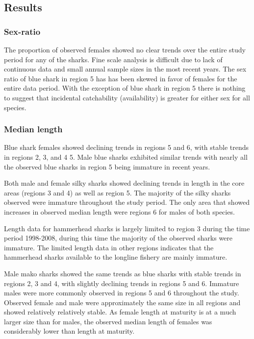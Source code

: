 \documentclass[12pt]{SCreport}
\begin{document}
% 
\subsection{Results}
\subsubsection{Sex-ratio}
    The proportion of observed females showed no clear trends over the entire study period for any of the sharks.  Fine scale analysis is difficult due to lack of continuous data and small annual sample sizes in the most recent years.   The sex ratio of blue shark in region 5 has has been skewed in favor of females for the entire data period. With the exception of blue shark in region 5 there is nothing to suggest that incidental catchability (availability) is greater for either sex for all species.
    
\subsubsection{Median length}
Blue shark females showed declining trends in regions 5 and 6, with stable trends in regions 2, 3, and 4 5. Male blue sharks exhibited similar trends with nearly all the observed blue sharks in region 5 being immature in recent years. 

Both male and female silky sharks showed declining trends in length in the core areas (regions 3 and 4) as well as region 5.  The majority of the silky sharks observed were immature throughout the study period. The only area  that showed increases in observed median length were regions 6 for males of both species. 

Length data for hammerhead sharks is largely limited to region 3 during the time period 1998-2008, during this time the majority of the observed sharks were immature. The limited length data in other regions indicates that the hammerhead sharks available to the longline fishery are mainly immature.

Male mako sharks showed the same trends as blue sharks with stable trends in regions 2, 3 and 4, with slightly declining trends in regions 5 and 6. Immature males were more commonly observed in regions 5 and 6 throughout the study.  Observed female and male were approximately the same size in all regions and showed relatively relatively stable.  As female length at maturity is at a much larger size than for males, the observed median length of females was considerably lower than  length at maturity.
\end{document}
